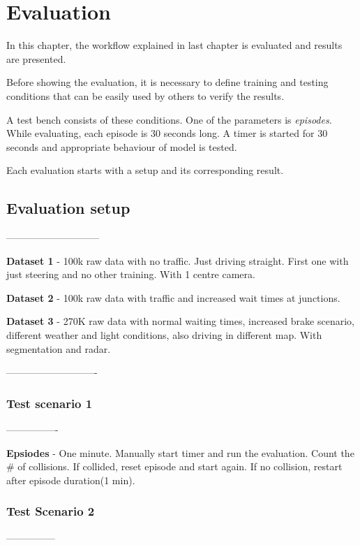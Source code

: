 \chapter{Evaluation}
In this chapter, the workflow explained in last chapter is evaluated and results are
presented.

Before showing the evaluation, it is necessary to define training and testing conditions
that can be easily used by others to verify the results.

A test bench consists of these conditions. One of the parameters is \textit{episodes}.
While evaluating, each episode is 30 seconds long. A timer is started for 30 seconds and
appropriate behaviour of model is tested.

Each evaluation starts with a setup and its corresponding result.


\section{Evaluation setup}

-----------------------------

\textbf{Dataset 1} - 100k raw data with no traffic. Just driving straight. First one with just steering and no other training.  With 1 centre camera.

\textbf{Dataset 2} - 100k raw data with traffic and increased wait times at junctions.

\textbf{Dataset 3} - 270K raw data with normal waiting times, increased brake scenario, different weather and light conditions, also driving in different map. With segmentation and radar.

----------------------------

\subsection{Test scenario 1}

----------------

\textbf{Epsiodes} - One minute. Manually start timer and run the evaluation. Count the \# of collisions. If collided, reset episode and start again. If no collision, restart after episode duration(1 min).


\subsection{Test Scenario 2}

---------------

